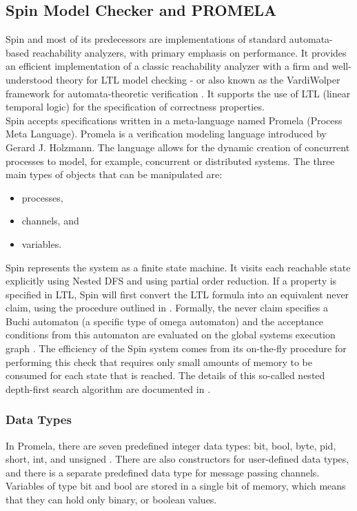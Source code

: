\bigskip

\subsection{Spin Model Checker and PROMELA}
\noindent
Spin and most of its predecessors are implementations of standard automata-based reachability analyzers, with primary emphasis on performance. It provides an efficient implementation of a classic reachability analyzer with a firm and well-understood theory for LTL model checking \cite{holzmann2000spin} - or also known as the VardiWolper framework for automata-theoretic verification \cite{Vardi1986}. It supports the use of LTL (linear temporal logic) for the specification of correctness properties.\\

Spin accepts specifications written in a meta-language named Promela (Process Meta Language). Promela is a verification modeling language introduced by Gerard J. Holzmann. The language allows for the dynamic creation of concurrent processes to model, for example, concurrent or distributed systems. The three main types of objects that can be manipulated are: 
  \begin{itemize}
      \item processes,
      \item channels, and
      \item variables. 
    \end{itemize} \bigskip

Spin represents the system as a finite state machine. It visits each reachable state explicitly using Nested DFS and using partial order reduction. If a property is specified in LTL, Spin will first convert the LTL formula into an equivalent never claim, using the procedure outlined in \cite{Gerth1995}. Formally, the never claim specifies a Buchi automaton (a specific type of omega automaton) and the acceptance conditions from this automaton are evaluated on the global systems execution graph \cite{holzmann2000spin}. The efficiency of the Spin system comes from its on-the-fly procedure for performing this check that requires only small amounts of memory to be consumed for each state that is reached. The details of this so-called nested depth-first search algorithm are documented in \cite{Holzmann1996}. 

\subsubsection{Data Types}
\noindent
In Promela, there are seven predefined integer data types: bit, bool, byte, pid, short, int, and unsigned . There are also constructors for user-defined data types, and there is a separate predefined data type for message passing channels. Variables of type bit and bool are stored in a single bit of memory, which means that they can hold only binary, or boolean values.  \\

